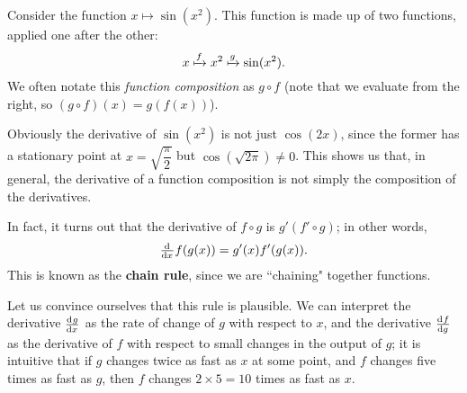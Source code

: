 


\begin{center}
\end{center}
Consider the function $ x \mapsto \sin (x^2) $. This function is made up of two
functions, applied one after the other:
\begin{displaymath}
  x \xmapsto{f} x^2 \xmapsto{g} \sin(x^2).
\end{displaymath}
We often notate this \textit{function composition} as $ g \circ f $ (note that we
evaluate from the right, so $ (g \circ f)(x) = g(f(x)) $).

Obviously the derivative of $ \sin(x^2) $ is not just $ \cos(2x) $, since the former
has a stationary point at $ x = \sqrt{\dfrac{\pi}{2}} $ but $ \cos(\sqrt{2\pi}) \neq 0 $. This
shows us that, in general, the derivative of a function composition is not simply the composition
of the derivatives.

In fact, it turns out that the derivative of $ f \circ g $ is $ g' (f' \circ g) $; in other words,
\begin{displaymath}
  \od{}{x} f(g(x)) = g'(x) f'(g(x)).
\end{displaymath}
This is known as the \textbf{chain rule}, since we are ``chaining" together functions.

Let us convince ourselves that this rule is plausible. We can interpret the
derivative $ \od{g}{x} $ as the rate of change of $ g $ with respect to $ x $, and the derivative $ \od{f}{g} $
as the derivative of $ f $ with respect to small changes in the output of $ g $; it is intuitive that if $ g $ changes
twice as fast as $ x $ at some point, and $ f $ changes five times as fast as $ g $, then $ f $ changes $ 2 \times 5 = 10 $
times as fast as $ x $.

